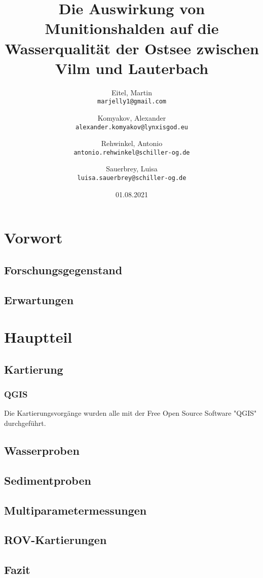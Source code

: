 \documentclass[12pt,titlepage]{scrreprt}
\begin{document}
\begin{titlepage}
\title{Die Auswirkung von Munitionshalden auf die Wasserqualität der Ostsee zwischen Vilm und Lauterbach}
\date{01.08.2021}
\author{Eitel, Martin \\ \texttt{marjelly1@gmail.com}\and Komyakov, Alexander \\\texttt{alexander.komyakov@lynxisgod.eu} \\ \and Rehwinkel, Antonio \\ \texttt{antonio.rehwinkel@schiller-og.de} \\ \and Sauerbrey, Luisa \\ \texttt{luisa.sauerbrey@schiller-og.de}}
\maketitle
\end{titlepage}
\tableofcontents
\chapter{Vorwort}
\section{Forschungsgegenstand}
\section{Erwartungen}
\chapter{Hauptteil}
\section{Kartierung}
    \subsection*{QGIS}
    Die Kartierungsvorgänge wurden alle mit der Free Open Source Software "QGIS" durchgeführt.
\section{Wasserproben}
\section{Sedimentproben}
\section{Multiparametermessungen}
\section{ROV-Kartierungen}
\section{Fazit}
\end{document}
